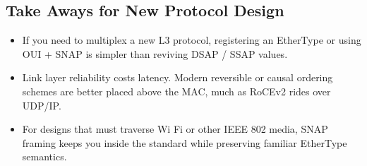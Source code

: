 \documentclass[../../../OAE-SPEC-MAIN.tex]{subfiles}
\begin{document}
\subsection{Take Aways for New Protocol Design}

\begin{itemize}
  \item If you need to multiplex a new L3 protocol, registering an EtherType or using OUI + SNAP is simpler than reviving DSAP / SSAP values.
  \item Link layer reliability costs latency. Modern reversible or causal ordering schemes are better placed above the MAC, much as RoCEv2 rides over UDP/IP.
  \item For designs that must traverse Wi Fi or other IEEE 802 media, SNAP framing keeps you inside the standard while preserving familiar EtherType semantics.
\end{itemize}
\end{document}
